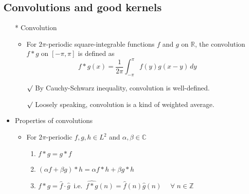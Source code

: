\documentclass[12pt]{article}
\newcommand{\rmk}{$\surd$}
\newcommand{\R}{\mathbb{R}}
\newcommand{\forany}{\; \forall \;}
\begin{document}
\subsection{Convolutions and good kernels}
\smallskip
\begin{itemize}
    \item[*] Convolution
    \begin{itemize}
        \item For $2\pi$-periodic square-integrable functions $f$ and $g$ on $\R$, the convolution $f*g$ on $[-\pi, \pi]$ is defined as \begin{equation*}
            f*g (x)=\frac{1}{2\pi}\int_{-\pi}^\pi f(y)g(x-y)\,dy
        \end{equation*}
        \item[\rmk] By Cauchy-Schwarz inequality, convolution is well-defined.
        \item[\rmk] Loosely speaking, convolution is a kind of weighted average. 
    \end{itemize}
    \item Properties of convolutions
    \begin{itemize}
        \item For $2\pi$-periodic $f, g, h\in L^2$ and $\alpha, \beta \in \mathbb{C}$  \begin{enumerate}
            \item $f*g=g*f$
            \item $(\alpha f+\beta g)* h= \alpha f*h+\beta g*h$
            \item $\hat{f*g}=\hat{f}\cdot \hat{g}$ \,i.e.\, $\hat{f*g}(n)=\hat{f}(n)\hat{g}(n)\quad \forany n\in \mathbb{Z}$
        \end{enumerate}
    \end{itemize}
   

\end{itemize}
\end{document}
